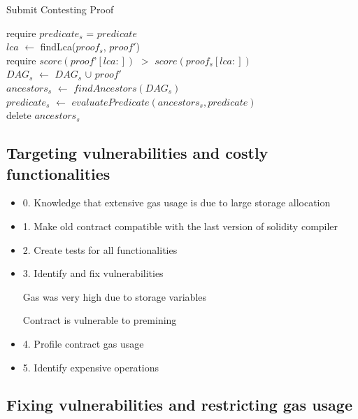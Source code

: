 \begin{algorithm}
    \caption{Submit Contesting Proof}
    \label{algo:contest_old}
    require $predicate_{s}$ = $predicate$\\
    $lca$ $\leftarrow$ findLca($proof_{s}$, $proof'$)\\
    require $score(proof’[lca:])$ $>$ $score(proof_{s}[lca:])$ \\
    $DAG_{s}$ $\leftarrow$ $DAG_{s}$ $\cup$ $proof'$\\
    $ancestors_{s}$ $\leftarrow$ $findAncestors(DAG_{s})$\\
    $predicate_{s}$ $\leftarrow$ $evaluatePredicate(ancestors_{s},
    predicate)$\\
    delete $ancestors_{s}$\\
\end{algorithm}

\subsection{Targeting vulnerabilities and costly functionalities}

\begin{itemize}
    \item
        0. Knowledge that extensive gas usage is due to large storage
        allocation
    \item
        1. Make old contract compatible with the last version of solidity
        compiler
    \item
        2. Create tests for all functionalities
    \item
        3. Identify and fix vulnerabilities

        Gas was very high due to storage variables

        Contract is vulnerable to premining
    \item
        4. Profile contract gas usage
    \item
        5. Identify expensive operations
\end{itemize}

\subsection{Fixing vulnerabilities and restricting gas usage}

